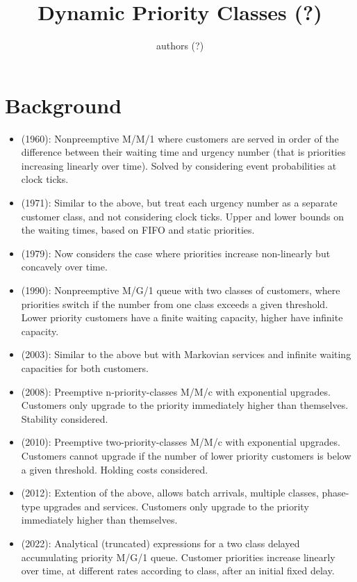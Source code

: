 \documentclass{article}
\title{Dynamic Priority Classes (?)}
\author{authors (?)}
\date{}
\begin{document}
\maketitle

\section{Background}
\begin{itemize}
  \item \cite{jackson60} (1960): Nonpreemptive M/M/1 where customers are served in order of the difference between their waiting time and urgency number (that is priorities increasing linearly over time). Solved by considering event probabilities at clock ticks.
  \item \cite{holtzman71} (1971): Similar to the above, but treat each urgency number as a separate customer class, and not considering clock ticks. Upper and lower bounds on the waiting times, based on FIFO and static priorities.
  \item \cite{netterman79} (1979): Now considers the case where priorities increase non-linearly but concavely over time.
  \item \cite{fratini90} (1990): Nonpreemptive M/G/1 queue with two classes of customers, where priorities switch if the number from one class exceeds a given threshold. Lower priority customers have a finite waiting capacity, higher have infinite capacity.
  \item \cite{knessl03} (2003): Similar to the above but with Markovian services and infinite waiting capacities for both customers.
  \item \cite{xie08} (2008): Preemptive n-priority-classes M/M/c with exponential upgrades. Customers only upgrade to the priority immediately higher than themselves. Stability considered.
  \item \cite{down10} (2010): Preemptive two-priority-classes M/M/c with exponential upgrades. Customers cannot upgrade if the number of lower priority customers is below a given threshold. Holding costs considered.
  \item \cite{he12} (2012): Extention of the above, allows batch arrivals, multiple classes, phase-type upgrades and services. Customers only upgrade to the priority immediately higher than themselves.
  \item \cite{bilodeau22} (2022): Analytical (truncated) expressions for a two class delayed accumulating priority M/G/1 queue. Customer priorities increase linearly over time, at different rates according to class, after an initial fixed delay.
\end{itemize}
\end{document}

